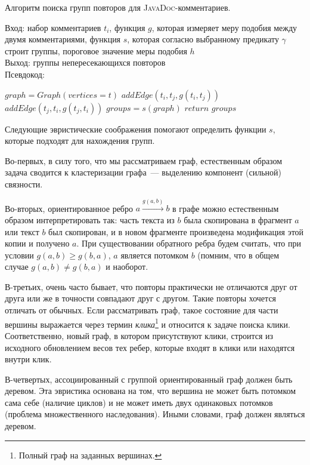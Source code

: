 \begin{algorithm}[t!]
\caption{Алгоритм поиска групп повторов для \textsc{JavaDoc}-комментариев.}\label{alg:groupDuplicate}
Вход: набор комментариев $t_{i}$, функция $g$, которая измеряет меру подобия между двумя комментариями, функция $s$, которая согласно выбранному предикату $\gamma$ строит группы, пороговое значение меры подобия $h$\\
Выход: группы непересекающихся повторов\\
Псевдокод:
\begin{algorithmic}[1]
\State $graph = Graph(vertices=t)$
\State $addEdge(t_{i},t_{j},g(t_{i},t_{j}))$
\EndIf
{}
\State $addEdge(t_{j},t_{i},g(t_{j},t_{i}))$
\EndIf
\EndFor
\EndFor
\State $groups = s(graph)$
\State $return$ $groups$
\end{algorithmic}
\end{algorithm}


Следующие эвристические соображения помогают определить функции $s$, которые подходят для нахождения групп.

Во-первых, в силу того, что мы рассматриваем граф, естественным образом задача сводится к кластеризации графа~--- выделению компонент (сильной) связности.

Во-вторых, ориентированное ребро $a \xrightarrow{g(a,b)} b$ в графе можно естественным образом интерпретировать так: часть текста из $b$ была скопирована в фрагмент $a$ или текст $b$ был скопирован, и в новом фрагменте произведена модификация этой копии и получено $a$.
При существовании обратного ребра будем считать, что при условии $g(a,b)\geq g(b,a)$, $a$ является потомком $b$ (помним, что в общем случае $g(a,b)\neq g(b,a)$ и наоборот.

В-третьих, очень часто бывает, что повторы практически не отличаются друг от друга или же в точности совпадают друг с другом.
Такие повторы хочется отличать от обычных.
Если рассматривать граф, такое состояние для части вершины выражается через термин \emph{клика}\footnote{Полный граф на заданных вершинах.} и относится к задаче поиска клики.
Соответственно, новый граф, в котором присутствуют клики, строится из исходного обновлением весов тех ребер, которые входят в клики или находятся внутри клик.

В-четвертых, ассоциированный с группой ориентированный граф должен быть деревом.
Эта эвристика основана на том, что вершина не может быть потомком сама себе (наличие циклов) и не может иметь двух одинаковых потомков (проблема множественного наследования).
Иными словами, граф должен являться деревом.

